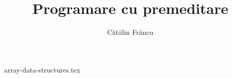 \documentclass[12pt,openany]{book}
\begin{document}

\raggedbottom

\title{Programare cu premeditare}
\author{Cătălin Frâncu}
\date{}

\maketitle


\mainmatter

\begingroup
\hypersetup{hidelinks} %
\tableofcontents
\endgroup

\cleardoublepage

{array-data-structures.tex}
\end{document}
